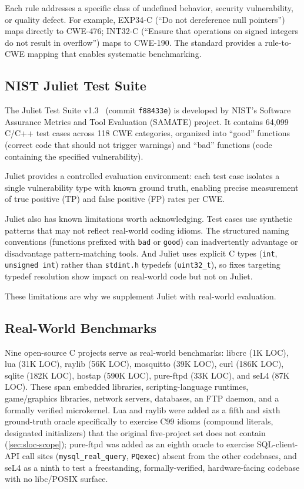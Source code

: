 Each rule addresses a specific class of undefined behavior, security
vulnerability, or quality defect.  For example, EXP34-C (``Do not
dereference null pointers'') maps directly to CWE-476; INT32-C
(``Ensure that operations on signed integers do not result in
overflow'') maps to CWE-190.  The standard provides a rule-to-CWE
mapping that enables systematic benchmarking.

\subsection{NIST Juliet Test Suite}

The Juliet Test Suite v1.3~\cite{juliet} (commit \texttt{f88433e})
is developed by NIST's
Software Assurance Metrics and Tool Evaluation (SAMATE) project.
It contains 64,099 C/C++ test cases across 118 CWE categories,
organized into ``good'' functions (correct code that should not
trigger warnings) and ``bad'' functions (code containing the
specified vulnerability).

Juliet provides a controlled evaluation environment: each test case
isolates a single vulnerability type with known ground truth, enabling
precise measurement of true positive (TP) and false positive (FP) rates
per CWE.

Juliet also has known limitations worth acknowledging.  Test cases use
synthetic patterns that may not reflect real-world coding idioms.  The
structured naming conventions (functions prefixed with \texttt{bad} or
\texttt{good}) can inadvertently advantage or disadvantage
pattern-matching tools.  And Juliet uses explicit C types
(\texttt{int}, \texttt{unsigned int}) rather than \texttt{stdint.h}
typedefs (\texttt{uint32\_t}), so fixes targeting typedef resolution
show impact on real-world code but not on Juliet.

These limitations are why we supplement Juliet with real-world
evaluation.

\subsection{Real-World Benchmarks}

Nine open-source C projects serve as real-world benchmarks:
libcrc (1K LOC), lua (31K LOC), raylib (56K LOC), mosquitto (39K LOC),
curl (186K LOC), sqlite (182K LOC), hostap (590K LOC), pure-ftpd (33K
LOC), and seL4 (87K LOC).  These span embedded libraries,
scripting-language runtimes, game/graphics libraries, network servers,
databases, an FTP daemon, and a formally verified microkernel.  Lua and
raylib were added as a fifth and sixth ground-truth oracle specifically
to exercise C99 idioms (compound literals, designated initializers) that
the original five-project set does not contain (\cref{sec:sloc-scope});
pure-ftpd was added as an eighth oracle to exercise SQL-client-API call
sites (\texttt{mysql\_real\_query}, \texttt{PQexec}) absent from the
other codebases, and seL4 as a ninth to test a freestanding,
formally-verified, hardware-facing codebase with no libc/POSIX surface.
